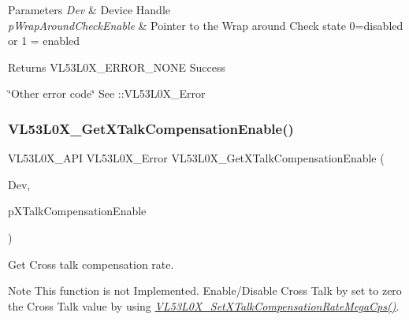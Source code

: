 \begin{DoxyParams}{Parameters}
{\em Dev} & Device Handle \\
\hline
{\em p\+Wrap\+Around\+Check\+Enable} & Pointer to the Wrap around Check state 0=disabled or 1 = enabled \\
\hline
\end{DoxyParams}
\begin{DoxyReturn}{Returns}
V\+L53\+L0\+X\+\_\+\+E\+R\+R\+O\+R\+\_\+\+N\+O\+NE Success 

\char`\"{}\+Other error code\char`\"{} See \+::\+V\+L53\+L0\+X\+\_\+\+Error 
\end{DoxyReturn}
\mbox{\label{group__VL53L0X__parameters__group_gae0cd0ec86a3dd0270fb57587c49ac822}} 
\subsubsection{\texorpdfstring{V\+L53\+L0\+X\+\_\+\+Get\+X\+Talk\+Compensation\+Enable()}{VL53L0X\_GetXTalkCompensationEnable()}}
{\footnotesize\ttfamily V\+L53\+L0\+X\+\_\+\+A\+PI V\+L53\+L0\+X\+\_\+\+Error V\+L53\+L0\+X\+\_\+\+Get\+X\+Talk\+Compensation\+Enable (\begin{DoxyParamCaption}\item[{\hyperlink{group__VL53L0X__platform__group_ga2d6405308b1dd524b462f1b8fb97d167}{V\+L53\+L0\+X\+\_\+\+D\+EV}}]{Dev,  }\item[{\hyperlink{vl53l0x__types_8h_aba7bc1797add20fe3efdf37ced1182c5}{uint8\+\_\+t} $\ast$}]{p\+X\+Talk\+Compensation\+Enable }\end{DoxyParamCaption})}



Get Cross talk compensation rate. 

\begin{DoxyNote}{Note}
This function is not Implemented. Enable/\+Disable Cross Talk by set to zero the Cross Talk value by using {\itshape \hyperlink{group__VL53L0X__parameters__group_ga5a9549bdb784e68ef58663c21542f7ad}{V\+L53\+L0\+X\+\_\+\+Set\+X\+Talk\+Compensation\+Rate\+Mega\+Cps()}}.
\end{DoxyNote}

